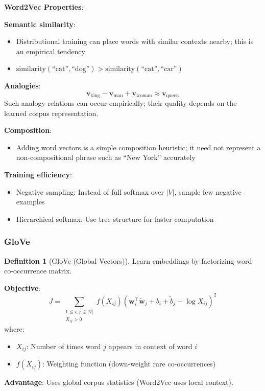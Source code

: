 \documentclass[11pt,twoside]{article}
\numberwithin{equation}{section}
\newcommand{\vect}[1]{\bm{#1}}
\theoremstyle{plain}
\theoremstyle{definition}
\newtheorem{definition}[theorem]{Definition}
\theoremstyle{remark}
\newenvironment{keyidea}{
  \begin{tcolorbox}[colback=yellow!5!white,
                    colframe=yellow!50!black,
                    title=Key Idea,
                    breakable,
                    enhanced,
                    sharp corners,
                    boxrule=0.8pt,
                    left=6pt, right=6pt, top=6pt, bottom=6pt]
}{
  \end{tcolorbox}
}
\begin{document}
\begin{keyidea}
\textbf{Word2Vec Properties}:

\textbf{Semantic similarity}:
\begin{itemize}
\item Distributional training can place words with similar contexts nearby; this is an empirical tendency
\item $\text{similarity}(\text{``cat''}, \text{``dog''}) > \text{similarity}(\text{``cat''}, \text{``car''})$
\end{itemize}

\textbf{Analogies}:
\[
\vect{v}_{\text{king}} - \vect{v}_{\text{man}} + \vect{v}_{\text{woman}} \approx \vect{v}_{\text{queen}}
\]
Such analogy relations can occur empirically; their quality depends on the learned corpus representation.

\textbf{Composition}:
\begin{itemize}
\item Adding word vectors is a simple composition heuristic; it need not represent a non-compositional phrase such as ``New York'' accurately
\end{itemize}

\textbf{Training efficiency}:
\begin{itemize}
\item Negative sampling: Instead of full softmax over $|V|$, sample few negative examples
\item Hierarchical softmax: Use tree structure for faster computation
\end{itemize}
\end{keyidea}

\subsubsection{GloVe}

\begin{definition}[GloVe (Global Vectors)]
Learn embeddings by factorizing word co-occurrence matrix.

\textbf{Objective}:
\[
J = \sum_{\substack{1\le i,j\le |V|\\X_{ij}>0}} f(X_{ij})(\vect{w}_i^\top \tilde{\vect{w}}_j + b_i + \tilde{b}_j - \log X_{ij})^2
\]
where:
\begin{itemize}
\item $X_{ij}$: Number of times word $j$ appears in context of word $i$
\item $f(X_{ij})$: Weighting function (down-weight rare co-occurrences)
\end{itemize}

\textbf{Advantage}: Uses global corpus statistics (Word2Vec uses local context).
\end{definition}
\end{document}

